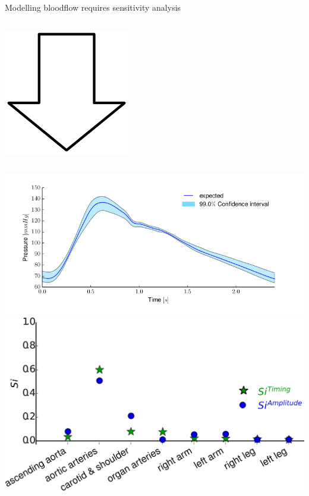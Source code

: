 \documentclass{beamer}
\begin{document}
\begin{frame}{Modelling bloodflow requires sensitivity analysis}{}
\begin{columns}
    \end{columns}
    \begin{center}
    \includegraphics[width=.1\textwidth]{figures/south.pdf}
    \end{center}
    \begin{columns}
        \includegraphics[width=\textwidth]{ntnu/AorticPressure_parameterUncertainty.png}
        \includegraphics[width=\textwidth]{ntnu/results/sensitivity-pointOfinflection.png}
    \end{columns}
    \end{frame}
\end{document}
